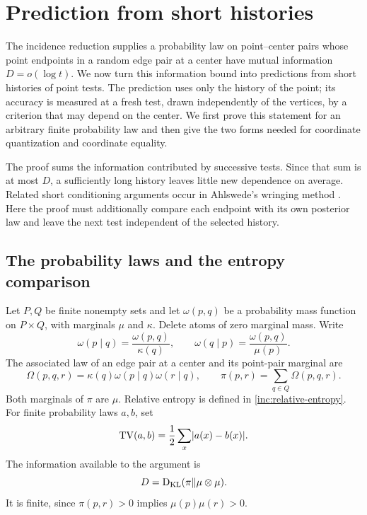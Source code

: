 \section{Prediction from short histories}\label{sec:prediction}

The incidence reduction supplies a probability law on point--center pairs whose
point endpoints in a random edge pair at a center have mutual information \(D=o(\log t)\).
We now turn this information bound into predictions from short histories of
point tests.  The prediction uses only the history of the point; its accuracy
is measured at a fresh test, drawn independently of the vertices, by a
criterion that may depend on the center.  We first prove this
statement for an arbitrary finite probability law and then give the two forms
needed for coordinate quantization and coordinate equality.

The proof sums the information contributed by successive tests. Since
that sum is at most \(D\), a sufficiently long history leaves little
new dependence on average. Related short conditioning arguments occur in
Ahlswede's
wringing method \cite[Section~4, Lemma~3]{Ahlswede1982}.
Here the proof must additionally compare each endpoint with its own
posterior law and leave the next test independent of the selected history.

\subsection{The probability laws and the entropy comparison}

Let \(P,Q\) be finite nonempty sets and let \(\omega(p,q)\) be a probability
mass function on \(P\times Q\), with marginals \(\mu\) and \(\kappa\).
Delete atoms of zero marginal mass.  Write
\[
 \omega(p\mid q)=\frac{\omega(p,q)}{\kappa(q)},
 \qquad
 \omega(q\mid p)=\frac{\omega(p,q)}{\mu(p)}.
\]
The associated law of an edge pair at a center and its point-pair marginal are
\begin{equation}\label{pred:wedge-law}
 \Omega(p,q,r)=\kappa(q)\omega(p\mid q)\omega(r\mid q),
 \qquad
 \pi(p,r)=\sum_{q\in Q}\Omega(p,q,r).
\end{equation}
Both marginals of \(\pi\) are \(\mu\). Relative entropy is defined in
\eqref{inc:relative-entropy}. For finite probability laws \(a,b\), set
\[
 \operatorname{TV}(a,b)=\frac12\sum_x\lvert a(x)-b(x)\rvert.
\]
The information available to the argument is
\begin{equation}\label{pred:information}
 D=\operatorname{D_{\mathrm{KL}}}(\pi\Vert\mu\otimes\mu).
\end{equation}
It is finite, since \(\pi(p,r)>0\) implies \(\mu(p)\mu(r)>0\).

